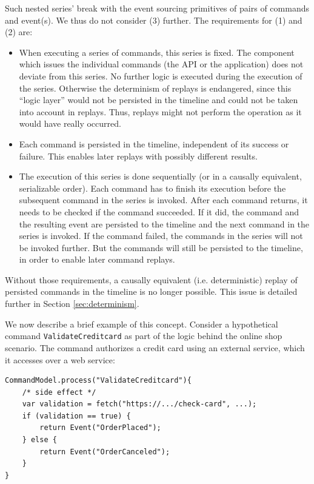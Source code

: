 Such nested series' break with the event sourcing primitives of pairs of commands 
and event(s). We thus do not consider (3) further. The requirements for (1) and 
(2) are:


\begin{itemize}
\item When executing a series of commands, this series is fixed. The component 
which issues the individual commands (the API or the application) does not 
deviate from this series. No further logic is executed during the execution of 
the series. Otherwise the determinism of replays is endangered, since this 
``logic layer'' would not be persisted in the timeline and could not be taken 
into account in replays. Thus, replays might not perform the operation as it 
would have really occurred.

\item Each command is persisted in the timeline, independent of its success or 
failure. This enables later replays with possibly different results.

\item The execution of this series is done sequentially (or in a causally 
equivalent, serializable order). Each command has to finish its execution 
before the subsequent command in the series is invoked. After each command 
returns, it needs to be checked if the command succeeded. If it did, the 
command and the resulting event are persisted to the timeline and the next 
command in the series is invoked. If the command failed, the commands in the 
series will not be invoked further. But the commands will still be persisted 
to the timeline, in order to enable later command replays.
\end{itemize}

Without those requirements, a causally equivalent (i.e. deterministic) replay 
of persisted commands in the timeline is no longer possible. This issue is 
detailed further in Section \ref{sec:determinism}.

We now describe a brief example of this concept. Consider a hypothetical 
command \texttt{ValidateCreditcard} as part of the logic behind the online 
shop scenario. The command authorizes a credit card using an external service, 
which it accesses over a web service:

\begin{lstlisting}[style=styled]
CommandModel.process("ValidateCreditcard"){
	/* side effect */
	var validation = fetch("https://.../check-card", ...);
	if (validation == true) {
		return Event("OrderPlaced");
	} else {
		return Event("OrderCanceled");
	}
}
\end{lstlisting}


